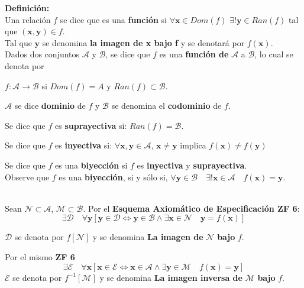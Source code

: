 \textbf{Definición:}\\
Una relación $f$ se dice que es una \textbf{función} si $\forall\mathbf{x}\in Dom(f)$ $\exists !\mathbf{y}\in Ran(f)$
tal que $(\mathbf{x,y})\in f$.\\
Tal que $\mathbf{y}$ se denomina \textbf{la imagen de x bajo f} y se denotará por $f(\mathbf{x})$.\\
\medskip
Dados dos conjuntos $\mathcal{A}$ y $\mathcal{B}$, se dice que $f$ es una \textbf{función de} $\mathcal{A}$
a $\mathcal{B}$, lo cual se denota por 
\begin{center}
$f:\mathcal{A}\longrightarrow\mathcal{B}$ si $Dom(f)=A$ y $Ran(f)\subset\mathcal{B}$.
\end{center}
\begin{iteritem}
\item $\mathcal{A}$ se dice \textbf{dominio} de $f$ y $\mathcal{B}$ se denomina el \textbf{codominio} de $f$. 
\item Se dice que $f$ es \textbf{suprayectiva} si: $Ran(f)=\mathcal{B}$.
\item Se dice que $f$ es \textbf{inyectiva} si: $\forall\mathbf{x,y}\in\mathcal{A}$, $\mathbf{x}\neq\mathbf{y}$ implica $f(\mathbf{x}) \neq f(\mathbf{y})$
\item Se dice que $f$ es una \textbf{biyección} si $f$ es \textbf{inyectiva} y \textbf{suprayectiva}.\\
Observe que $f$ es una \textbf{biyección}, si y sólo si, $\forall\mathbf{y}\in\mathcal{B}\quad\exists!\mathbf{x}\in\mathcal{A}\quad f(\mathbf{x})=\mathbf{y}$.\\
\end{iteritem}
\\
Sean $\mathcal{N}\subset\mathcal{A}$, $\mathcal{M}\subset\mathcal{B}$. Por el \textbf{Esquema Axiomático de Especificación ZF 6}:
\[\exists\mathcal{D}\quad\forall\mathbf{y}[\mathbf{y}\in\mathcal{D}\Longleftrightarrow\mathbf{y}\in\mathcal{B}\wedge\exists\mathbf{x}\in\mathcal{N}\quad\mathbf{y}=f(\mathbf{x})]\]
\begin{iteritem}
\item $\mathcal{D}$ se denota por $f[\mathcal{N}]$ y se denomina \textbf{La imagen de} $\mathcal{N}$ \textbf{bajo} $f$.
\item Por el mismo \textbf{ZF 6} 
	\[\exists\mathcal{E}\quad\forall\mathbf{x}[\mathbf{x}\in\mathcal{E}\Longleftrightarrow\mathbf{x}\in\mathcal{A}\wedge\exists\mathbf{y}\in\mathcal{M}\quad f(\mathbf{x})=\mathbf{y}]\]
$\mathcal{E}$ se denota por $f^{-1}[\mathcal{M}]$ y se denomina \textbf{La imagen inversa de} $\mathcal{M}$ \textbf{bajo} $f$. 
\end{iteritem}
\newpage


